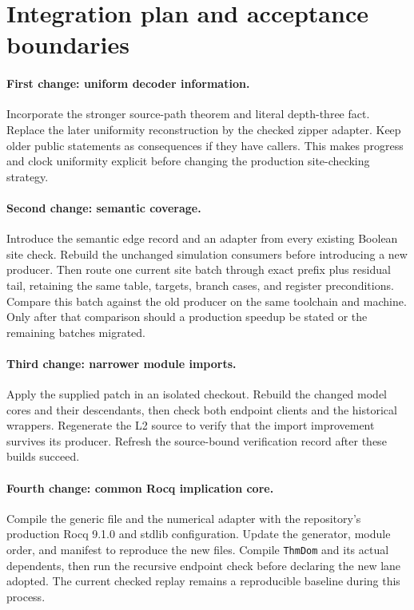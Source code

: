 \documentclass[11pt,letterpaper]{article}
\newcommand{\code}[1]{\texttt{\small #1}}
\begin{document}
\section{Integration plan and acceptance boundaries}

\paragraph{First change: uniform decoder information.}
Incorporate the stronger source-path theorem and literal depth-three fact. Replace
the later uniformity reconstruction by the checked zipper adapter. Keep older public
statements as consequences if they have callers. This makes progress and clock
uniformity explicit before changing the production site-checking strategy.

\paragraph{Second change: semantic coverage.}
Introduce the semantic edge record and an adapter from every existing Boolean site
check. Rebuild the unchanged simulation consumers before introducing a new producer.
Then route one current site batch through exact prefix plus residual tail, retaining
the same table, targets, branch cases, and register preconditions. Compare this batch
against the old producer on the same toolchain and machine. Only after that comparison
should a production speedup be stated or the remaining batches migrated.

\paragraph{Third change: narrower module imports.}
Apply the supplied patch in an isolated checkout. Rebuild the changed model cores and
their descendants, then check both endpoint clients and the historical wrappers.
Regenerate the L2 source to verify that the import improvement survives its producer.
Refresh the source-bound verification record after these builds succeed.

\paragraph{Fourth change: common Rocq implication core.}
Compile the generic file and the numerical adapter with the repository's production
Rocq 9.1.0 and stdlib configuration. Update the generator, module order, and manifest
to reproduce the new files. Compile \code{ThmDom} and its actual dependents, then run
the recursive endpoint check before declaring the new lane adopted. The current
checked replay remains a reproducible baseline during this process.
\end{document}
